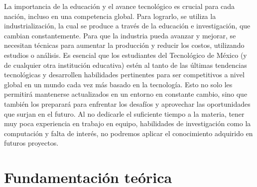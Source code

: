     La importancia de la educación y el avance tecnológico es crucial para cada nación, incluso en una competencia global. Para lograrlo, se utiliza la industrialización, la cual se produce a través de la educación e investigación, que cambian constantemente. Para que la industria pueda avanzar y mejorar, se necesitan técnicas para aumentar la producción y reducir los costos, utilizando estudios o análisis. 
    Es esencial que los estudiantes del Tecnológico de México (y de cualquier otra institución educativa) estén al tanto de las últimas tendencias tecnológicas y desarrollen habilidades pertinentes para ser competitivos a nivel global en un mundo cada vez más basado en la tecnología. Esto no solo les permitirá mantenerse actualizados en un entorno en constante cambio, sino que también los preparará para enfrentar los desafíos y aprovechar las oportunidades que surjan en el futuro. 
    Al no dedicarle el suficiente tiempo a la materia, tener muy poca experiencia en trabajo en equipo, habilidades de investigación como la computación y falta de interés, no podremos aplicar el conocimiento adquirido en futuros proyectos. 
    
    \section{Fundamentación teórica}
    
